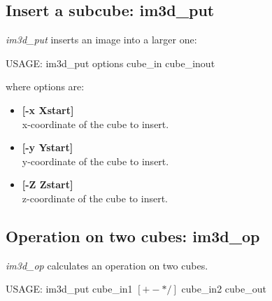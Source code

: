 \subsection{Insert a subcube: im3d\_put}
{\em im3d\_put} inserts an image into a larger one:
{\bf
\begin{center}
USAGE: im3d\_put options cube\_in  cube\_inout
\end{center}
}
where options are:
\begin{itemize}
\baselineskip=0.4truecm
\itemsep=0.1truecm
\item {\bf[-x Xstart]} \\
x-coordinate of the cube to insert.
\item {\bf[-y Ystart]} \\
y-coordinate of the cube to insert.
\item {\bf[-Z Zstart]} \\
z-coordinate of the cube to insert.
\end{itemize}

\subsection{Operation on two cubes: im3d\_op}
{\em im3d\_op} calculates an operation on two cubes.
{\bf
\begin{center}
USAGE: im3d\_put cube\_in1 $[+-*/]$ cube\_in2 cube\_out
\end{center}}

